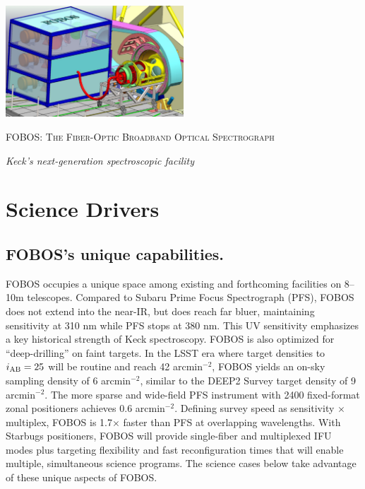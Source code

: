 \documentclass[oneside,11pt]{amsart}
\begin{document}


\vspace*{-1.5cm}

\centerline{\includegraphics[width=0.5\textwidth]{figs/FOBOS_inst_v2.pdf}}
\centerline{\textsc {\Large FOBOS: The Fiber-Optic Broadband Optical Spectrograph}}
\smallskip
\centerline{\large\it Keck's next-generation spectroscopic facility}




\section{Science Drivers}
\label{sec:goals}


\subsection{FOBOS's unique capabilities.} FOBOS occupies a unique space among existing and forthcoming
facilities on 8--10m telescopes.  Compared to Subaru Prime Focus Spectrograph (PFS), FOBOS does not extend into the near-IR, but does reach far bluer, maintaining sensitivity at 310 nm while PFS stops at 380 nm.  This UV sensitivity emphasizes a key historical strength of Keck spectroscopy.  FOBOS is also optimized for ``deep-drilling'' on faint targets. In the LSST era where target densities to $i_{\rm AB} = 25$ will be routine and reach 42 arcmin$^{-2}$, FOBOS yields an on-sky sampling density of 6 arcmin$^{-2}$, similar to the DEEP2 Survey target density of 9 arcmin$^{-2}$.  The more sparse and wide-field PFS instrument with 2400 fixed-format zonal positioners achieves 0.6 arcmin$^{-2}$.  Defining survey speed as sensitivity $\times$ multiplex, FOBOS is 1.7$\times$ faster than PFS at overlapping wavelengths.  With Starbugs positioners, FOBOS will provide single-fiber and multiplexed IFU modes plus targeting flexibility and fast reconfiguration times that will enable multiple, simultaneous science programs.  The
science cases below take advantage of these unique aspects of FOBOS.
\end{document}
